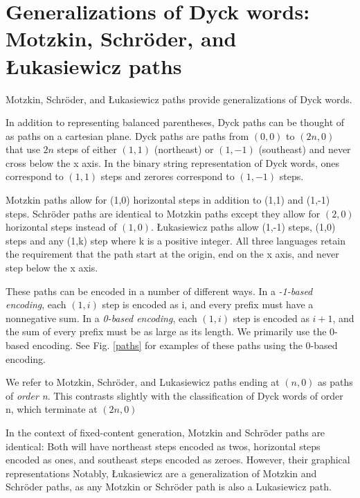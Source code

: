 \section{Generalizations of Dyck words: Motzkin, Schröder, and Łukasiewicz paths}
Motzkin, Schröder, and Łukasiewicz paths provide generalizations of Dyck words.  

In addition to representing balanced parentheses, Dyck paths can be thought of as paths on a cartesian plane.  Dyck paths are paths from $(0,0)$ to $(2n,0)$ that use $2n$ steps of either $(1,1)$ (northeast) or $(1,-1)$ (southeast) and never cross below the x axis. In the binary string representation of Dyck words, ones correspond to $(1,1)$ steps and zerores correspond to $(1,-1)$ steps.

Motzkin paths allow for (1,0) horizontal steps in addition to (1,1) and (1,-1) steps. Schröder paths are identical to Motzkin paths except they allow for $(2,0)$ horizontal steps instead of $(1,0)$.  Łukasiewicz paths allow (1,-1) steps, (1,0) steps and any (1,k) step where k is a positive integer.  All three languages retain the requirement that the path start at the origin, end on the x axis, and never step below the x axis. 

These paths can be encoded in a number of different ways.  In a \emph{-1-based encoding}, each $(1,i)$ step is encoded as i, and every prefix must have a nonnegative sum.  In a \emph{0-based encoding}, each $(1,i)$ step is encoded as $i+1$, and the sum of every prefix must be as large as its length. We primarily use the 0-based encoding. See Fig. \ref{paths}  for examples of these paths using the 0-based encoding.

We refer to Motzkin, Schröder, and Lukasiewicz paths ending at $(n,0)$ as paths of \emph{order n}.  This contrasts slightly with the classification of Dyck words of order n, which terminate at $(2n,0)$

In the context of fixed-content generation, Motzkin and Schröder paths are identical:  Both will have northeast steps encoded as twos, horizontal steps encoded as ones, and southeast steps encoded as zeroes.  However, their graphical representations Notably, Łukasiewicz are a generalization of Motzkin and Schröder paths, as any Motzkin or Schröder path is also a Lukasiewicz path.

\bigskip

